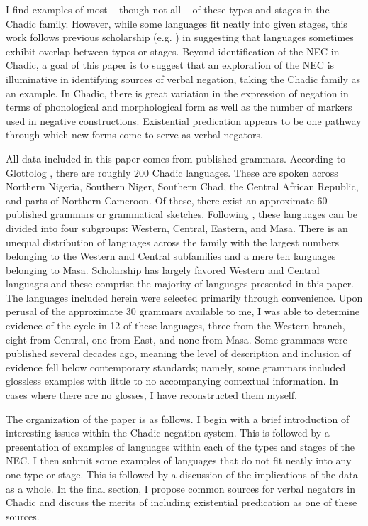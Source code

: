 \documentclass[output=paper]{langsci/langscibook}
\begin{document}
I find examples of most -- though not all -- of these types and stages in the Chadic family. However, while some languages fit neatly into given stages, this work follows previous scholarship (e.g. \citealt{Veselinova2016}) in suggesting that languages sometimes exhibit overlap between types or stages.  Beyond identification of the NEC in Chadic, a goal of this paper is to suggest that an exploration of the NEC is illuminative in identifying sources of verbal negation, taking the Chadic family as an example. In Chadic, there is great variation in the expression of negation in terms of phonological and morphological form as well as the number of markers used in negative constructions. Existential predication appears to be one pathway through which new forms come to serve as verbal negators. 

All data included in this paper comes from published grammars. According to
Glottolog \citep{HammarstromBank2018}, there are roughly 200 Chadic
languages. These are spoken across Northern Nigeria, Southern Niger,
Southern Chad, the Central African Republic, and parts of Northern
Cameroon. Of these, there exist an approximate 60 published grammars or
grammatical sketches. Following \citet{Newman2000}, these languages can be
divided into four subgroups: Western, Central, Eastern, and Masa. There is
an unequal distribution of languages across the family with the largest
numbers belonging to the Western and Central subfamilies and a mere ten
languages belonging to Masa. Scholarship has largely favored Western and
Central languages and these comprise the majority of languages presented in
this paper. The languages included herein were selected primarily through
convenience. Upon perusal of the approximate 30 grammars available to me, I
was able to determine evidence of the cycle in 12 of these languages, three
from the Western branch, eight from Central, one from East, and none from
Masa. Some grammars were published several decades ago, meaning the level
of description and inclusion of evidence fell below contemporary standards;
namely, some grammars included glossless examples with little to no
accompanying contextual information. In cases where there are no glosses, I
have reconstructed them myself.  

The organization of the paper is as follows. I begin with a brief
introduction of interesting issues within the Chadic negation system. This
is followed by a presentation of examples of languages within each of the
types and stages of the NEC. I then submit some examples of languages that
do not fit neatly into any one type or stage. This is followed by a
discussion of the implications of the data as a whole. In the final
section, I propose common sources for verbal negators in Chadic and discuss
the merits of including existential predication as one of these sources.
\end{document}
